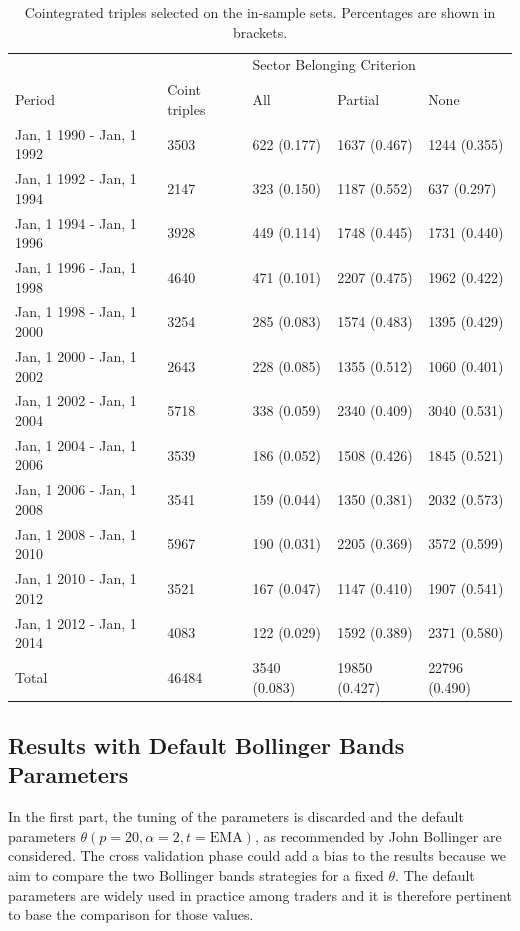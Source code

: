 \documentclass[11pt,a4,twosided,singlespacing,titlepagenumber=on]{scrreprt}
\numberwithin{equation}{chapter} %
\theoremstyle{remark}
\begin{document}
\begin{table}[H]
\centering
\begin{tabular}{lllll}
\hline
                              && \multicolumn{3}{l}{Sector Belonging Criterion}  \\
Period & Coint triples & All & Partial & None \\
\hline
Jan, 1 1990 - Jan, 1 1992 & 3503    & 622 (0.177) & 1637 (0.467) & 1244 (0.355) \\
Jan, 1 1992 - Jan, 1 1994 & 2147    & 323 (0.150) & 1187 (0.552)  & 637 (0.297) \\
Jan, 1 1994 - Jan, 1 1996 & 3928    & 449 (0.114) & 1748 (0.445)  & 1731 (0.440) \\
Jan, 1 1996 - Jan, 1 1998 & 4640    & 471 (0.101) & 2207 (0.475)  & 1962 (0.422) \\
Jan, 1 1998 - Jan, 1 2000 & 3254    & 285 (0.083) & 1574 (0.483)  & 1395 (0.429) \\
Jan, 1 2000 - Jan, 1 2002 & 2643    & 228 (0.085) & 1355 (0.512)  & 1060 (0.401)\\
Jan, 1 2002 - Jan, 1 2004 & 5718    & 338 (0.059) & 2340 (0.409)  & 3040 (0.531) \\
Jan, 1 2004 - Jan, 1 2006 & 3539    & 186 (0.052) & 1508 (0.426)  & 1845 (0.521) \\
Jan, 1 2006 - Jan, 1 2008 & 3541    & 159 (0.044) & 1350 (0.381)  & 2032 (0.573) \\
Jan, 1 2008 - Jan, 1 2010 & 5967    & 190 (0.031) & 2205 (0.369)  & 3572 (0.599) \\
Jan, 1 2010 - Jan, 1 2012 & 3521    & 167 (0.047) & 1147 (0.410)  & 1907 (0.541) \\
Jan, 1 2012 - Jan, 1 2014 & 4083    & 122 (0.029) & 1592 (0.389)  & 2371 (0.580) \\
\hline
Total & 46484 & 3540 (0.083) & 19850 (0.427) & 22796 (0.490) \\
\hline
\end{tabular}
\caption{Cointegrated triples selected on the in-sample sets. Percentages are shown in brackets.}
\label{tab:calibration_selection}
\end{table}

\subsection{Results with Default Bollinger Bands Parameters}
In the first part, the tuning of the parameters is discarded and the default parameters $\theta (p=20, \alpha = 2, t = \text{EMA})$, as recommended by John Bollinger are considered. The cross validation phase could add a bias to the results because we aim to compare the two Bollinger bands strategies for a fixed $\theta$. The default parameters are widely used in practice among traders and it is therefore pertinent to base the comparison for those values. 
\end{document}
